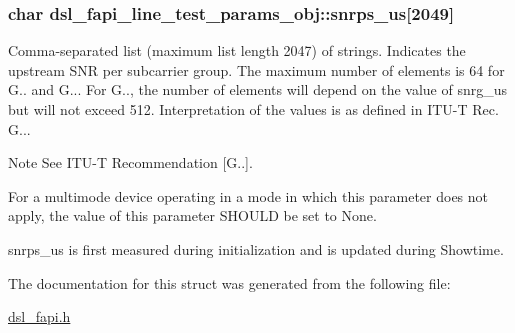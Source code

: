 \hypertarget{structdsl__fapi__line__test__params__obj_a2bb54209cc9ef6b6e17b57b723e59293}{
\subsubsection[{snrps\-\_\-us}]{\setlength{\rightskip}{0pt plus 5cm}char dsl\-\_\-fapi\-\_\-line\-\_\-test\-\_\-params\-\_\-obj\-::snrps\-\_\-us\mbox{[}2049\mbox{]}}}\label{structdsl__fapi__line__test__params__obj_a2bb54209cc9ef6b6e17b57b723e59293}
Comma-\/separated list (maximum list length 2047) of strings. Indicates the upstream S\-N\-R per subcarrier group. The maximum number of elements is 64 for G.. and G... For G.., the number of elements will depend on the value of snrg\-\_\-us but will not exceed 512. Interpretation of the values is as defined in I\-T\-U-\/\-T Rec. G... \begin{DoxyNote}{Note}
See I\-T\-U-\/\-T Recommendation \mbox{[}G..\mbox{]}. 

For a multimode device operating in a mode in which this parameter does not apply, the value of this parameter S\-H\-O\-U\-L\-D be set to None. 

snrps\-\_\-us is first measured during initialization and is updated during Showtime. 
\end{DoxyNote}


The documentation for this struct was generated from the following file\-:\begin{DoxyCompactItemize}
\item 
\hyperlink{dsl__fapi_8h}{dsl\-\_\-fapi.\-h}\end{DoxyCompactItemize}
